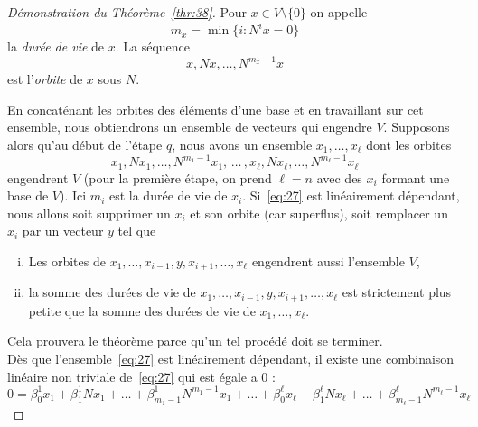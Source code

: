 \begin{proof}[Démonstration du Théorème~\ref{thr:38}] 
  Pour $x \in V \setminus \{0\}$ on appelle 
  \begin{displaymath}
    m_x = \min \{ i \colon N^ix = 0\}
  \end{displaymath}
  la \emph{durée de vie} de $x$. 
  La séquence 
  \begin{displaymath}
    x, Nx, \dots, N^{m_x-1} x
  \end{displaymath}
  est l'\emph{orbite} de $x$ sous $N$. 
  
  En concaténant les orbites des éléments d'une base et en travaillant sur cet ensemble, nous obtiendrons un ensemble de vecteurs qui engendre $V$. 
  Supposons alors qu'au début de l'étape $q$, nous avons un ensemble $x_1,\dots,x_\ell$ dont les orbites 
  \begin{equation}
    \label{eq:27}
    x_1,Nx_1,\dots,N^{m_1-1}x_1, \,\dots \, ,  x_\ell,Nx_\ell,\dots,N^{m_\ell-1}x_\ell
  \end{equation}
  engendrent $V$ (pour la première étape, on prend $\ell = n$ avec des $x_i$ formant une base de $V$). Ici $m_i$ est la durée de vie de $x_i$. Si~\eqref{eq:27} est linéairement dépendant, nous allons soit supprimer un $x_i$ et son orbite (car superflus), soit remplacer un $x_i$ par un vecteur $y$ tel que 
  \begin{enumerate}[i)]
  \item Les orbites de $x_1,\dots, x_{i-1},y,x_{i+1},\dots,x_{\ell}$ engendrent aussi l'ensemble  $V$, 
  \item la somme des durées de vie de $x_1,\dots, x_{i-1},y,x_{i+1},\dots,x_{\ell}$  est strictement plus petite que la somme des durées de vie de $x_1,\dots,x_{\ell}$. 
  \end{enumerate}
Cela prouvera le théorème parce qu'un tel procédé doit se terminer. \\

Dès que l'ensemble~\eqref{eq:27} est linéairement dépendant, il existe une combinaison linéaire non triviale de~\eqref{eq:27} qui est égale a $0$ :
\begin{displaymath}
0 =   β_0^1 x_1 + β_1^1 Nx_1+ \dots+ β_{m_1-1}^1 N^{m_1-1}x_1 + \dots + 
β_0^\ell x_\ell + β_1^\ell Nx_\ell+ \dots+ β_{m_\ell-1}^\ell N^{m_\ell-1}x_\ell 
\end{displaymath}


\end{proof}
